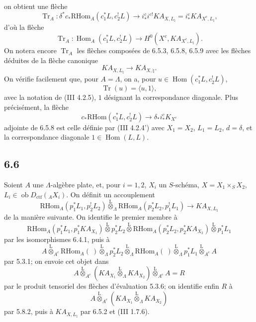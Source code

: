 \documentclass[11pt]{article}
\DeclareMathOperator{\Hom}{Hom}
\providecommand{\RHom}{\mathrm{RHom}}
\providecommand{\Tr}{\operatorname{Tr}}
\providecommand{\Tr}{\operatorname{Tr}}
\providecommand{\lten}{\overset{\mathrm L}{\otimes}}
\providecommand{\Ob}{\operatorname{ob}}
\providecommand{\Tr}{\operatorname{Tr}}
\providecommand{\RHom}{\mathrm{RHom}}
\providecommand{\Hom}{\operatorname{Hom}}
\providecommand{\lten}{\overset{\mathrm L}{\otimes}}
\providecommand{\RHom}{\mathrm R\mathcal{H}om}
\providecommand{\lten}{\overset{\mathrm L}{\otimes}}
\providecommand{\Ob}{\operatorname{ob}}
\providecommand{\Tr}{\operatorname{Tr}}
\providecommand{\lten}{\overset{\mathrm L}{\otimes}}
\providecommand{\lten}{\overset{\mathrm L}{\otimes}}
\providecommand{\Ob}{\operatorname{Ob}}
\providecommand{\lten}{\overset{\mathrm L}{\otimes}}
\begin{document}
on obtient une flèche
\begin{equation}
\Tr_A:\delta^*c_*\RHom_A(c_1^*L,c_2^!L)
\longrightarrow
i_*^ci^{c!}KA_{X,L_{\natural}}
=i_*^cKA_{X^c,L_{\natural}},
\tag{6.5.8}
\end{equation}
d'où la flèche
\begin{equation}
\Tr_A:\Hom_A(c_1^*L,c_2^!L)
\longrightarrow
H^0(X^c,KA_{X^c,L_{\natural}}).
\tag{6.5.9}
\end{equation}
On notera encore $\Tr_A$ les flèches composées de 6.5.3, 6.5.8, 6.5.9 avec les flèches déduites de la flèche canonique
\[
KA_{X,L_{\natural}}\longrightarrow KA_{X,\natural}.
\]
On vérifie facilement que, pour $A=\Lambda$, on a, pour $u\in\Hom(c_1^*L,c_2^!L)$,
\begin{equation}
\Tr(u)=\langle u,1\rangle,
\tag{6.5.10}
\end{equation}
avec la notation de (III 4.2.5), $1$ désignant la correspondance diagonale. Plus précisément, la flèche
\[
c_*\RHom(c_1^*L,c_2^!L)\longrightarrow \delta_*i_*^cK_{X^c}
\]
adjointe de 6.5.8 est celle définie par (III 4.2.4') avec $X_1=X_2$, $L_1=L_2$, $d=\delta$, et la correspondance diagonale $1\in\Hom(L,L)$.

\subsection*{6.6}
Soient $A$ une $\Lambda$-algèbre plate, et, pour $i=1,2$, $X_i$ un $S$-schéma, $X=X_1\times_SX_2$, $L_i\in\Ob D_{\mathrm{ctf}}({}_AX_i)$. On définit un accouplement
\begin{equation}
\RHom_A(p_1^*L_1,p_2^!L_2)
\lten_{\Lambda}
\RHom_A(p_2^*L_2,p_1^!L_1)
\longrightarrow
KA_{X,L_{\natural}}
\tag{6.6.1}
\end{equation}
de la manière suivante. On identifie le premier membre à
\[
\RHom_A(p_1^*L_1,p_1^*KA_{X_1})
\lten p_2^*L_2
\lten
\RHom_A(p_2^*L_2,p_2^*KA_{X_2})
\lten p_1^*L_1
\]
par les isomorphismes 6.4.1, puis à
\[
A\lten_{A^e}\RHom_A(\ )\lten_{\Lambda}p_2^*L_2
 \lten_{\Lambda}\RHom_A(\ )\lten_{\Lambda}p_1^*L_1\lten_{A^e}A
\]
par 5.3.1; on envoie cet objet dans
\[
A\lten_{A^e}(KA_{X_1}\lten_{\Lambda}KA_{X_2})\lten_{A^e}A=R
\]
par le produit tensoriel des flèches d'évaluation 5.3.6; on identifie enfin $R$ à
\[
A\lten_{A^e}(KA_{X_1}\lten_{\Lambda}KA_{X_2})
\]
par 5.8.2, puis à $KA_{X,L_{\natural}}$ par 6.5.2 et (III 1.7.6).
\end{document}
